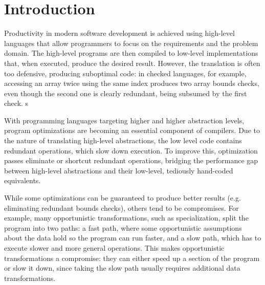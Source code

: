 \section{Introduction}
\label{sec:intro}


Productivity in modern software development is achieved using high-level languages that allow programmers to focus on the requirements and the problem domain. The high-level programs are then compiled to low-level implementations that, when executed, produce the desired result. However, the translation is often too defensive, producing suboptimal code: in checked languages, for example, accessing an array twice using the same index produces two array bounds checks, even though the second one is clearly redundant, being subsumed by the first check.
s

With programming languages targeting higher and higher abstraction levels, program optimizations are becoming an essential component of compilers. Due to the nature of translating high-level abstractions, the low level code contains redundant operations, which slow down execution. To improve this, optimization passes eliminate or shortcut redundant operations, bridging the performance gap between high-level abstractions and their low-level, tediously hand-coded equivalents.

While some optimizations can be guaranteed to produce better results (e.g. eliminating redundant bounds checks), others tend to be compromises. For example, many opportunistic transformations, such as specialization, split the program into two paths: a fast path, where some opportunistic assumptions about the data hold so the program can run faster, and a slow path, which has to execute slower and more general operations. This makes opportunistic transformations a compromise: they can either speed up a section of the program or slow it down, since taking the slow path usually requires additional data transformations.

